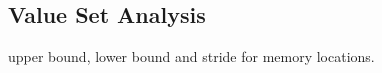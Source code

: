 
\subsection{Value Set Analysis}


upper bound, lower bound and stride for memory locations. \cite{wysinwyx}

